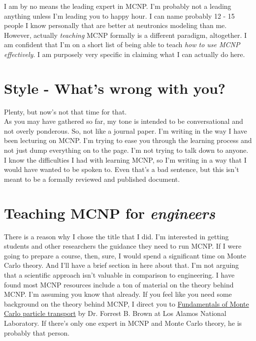 \documentclass[11pt,a4paper]{article}
\begin{document}
\noindent I am by no means the leading expert in MCNP. I'm probably not a leading anything unless I'm leading you to happy hour. I can name probably 12 - 15 people I know personally that are better at neutronics modeling than me. However, actually \textit{teaching} MCNP formally is a different paradigm, altogether. I am confident that I'm on a short list of being able to teach \textit{how to use MCNP effectively}. I am purposely very specific in claiming what I can actually do here. 

\section{Style - What's wrong with you?}
\noindent Plenty, but now's not that time for that. \\

\noindent As you may have gathered so far, my tone is intended to be conversational and not overly ponderous. So, not like a journal paper. I'm writing in the way I have been lecturing on MCNP. I'm trying to ease you through the learning process and not just dump everything on to the page. I'm not trying to talk down to anyone. I know the difficulties I had with learning MCNP, so I'm writing in a way that I would have wanted to be spoken to. Even that's a bad sentence, but this isn't meant to be a formally reviewed and published document.\\

\newpage


\section{Teaching MCNP for \textit{engineers}}
\noindent There is a reason why I chose the title that I did. I'm interested in getting students and other researchers the guidance they need to run MCNP. If I were going to prepare a course, then, sure, I would spend a significant time on Monte Carlo theory. And I'll have a brief section in here about that. I'm not arguing that a scientific approach isn't valuable in comparison to engineering. I have found most MCNP resources include a ton of material on the theory behind MCNP. I'm assuming you know that already. If you feel like you need some background on the theory behind MCNP, I direct you to \href{https://laws.lanl.gov/vhosts/mcnp.lanl.gov/pdf_files/la-ur-05-4983.pdf}{Fundamentals of Monte Carlo particle transport} by Dr. Forrest B. Brown at Los Alamos National Laboratory. If there's only one expert in MCNP and Monte Carlo theory, he is probably that person. 
\end{document}
